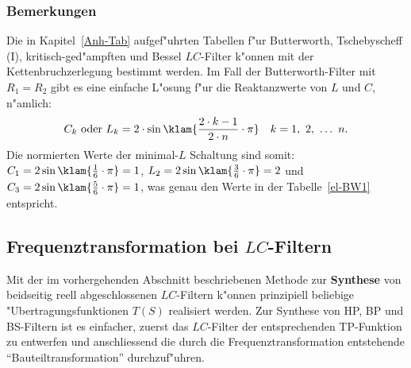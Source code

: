 \subsubsection{Bemerkungen}
Die in Kapitel~\ref{Anh-Tab} aufgef"uhrten Tabellen f"ur Butterworth, Tschebyscheff (I), kritisch-ged"ampften und Bessel $LC$-Filter k"onnen mit der Kettenbruchzerlegung bestimmt werden. Im Fall der Butterworth-Filter mit $R_1=R_2$ gibt es eine einfache L"osung f"ur die Reaktanzwerte von  $L$ und $C$, n"amlich:
\begin{equation*}
C_k~\text{oder}~L_k=2\cdot\sin\klam{\frac{2\cdot k-1}{2\cdot n}\cdot \pi}\quad k=1,~2,~\ldots~n.
\end{equation*} %
Die normierten Werte der minimal-$L$ Schaltung sind somit: $C_1=2\sin\klam{\frac{1}{6}\cdot \pi}=1$, $L_2=2\sin\klam{\frac{3}{6}\cdot \pi}=2$ und $C_3=2\sin\klam{\frac{5}{6}\cdot \pi}=1$, was genau den Werte in der Tabelle~\ref{el-BW1} entspricht. 

\subsection{Frequenztransformation bei {\boldmath $LC$}-Filtern}
Mit der im vorhergehenden Abschnitt beschriebenen Methode zur {\bf Synthese}
von beidseitig reell abgeschlossenen $LC$-Filtern k"onnen prinzipiell
beliebige "Ubertragungs\-funk\-tion\-en $T(S)$ realisiert werden.  Zur
Synthese von HP, BP und BS-Filtern ist es einfacher, zuerst
das $LC$-Filter der entsprechenden TP-Funktion zu entwerfen und
anschliessend die durch die
Frequenztransformation entstehende
``Bauteiltransformation'' durchzuf"uhren.
